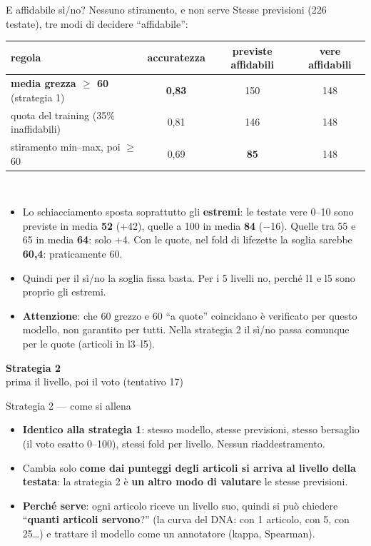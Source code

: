 \documentclass[aspectratio=169]{beamer}
\newcommand{\hl}[1]{\textbf{#1}}
\newcommand{\divider}[2]{%
  \begin{frame}[plain]
    \vfill
    \begin{center}
      {\color{dividerblue}\Huge\textbf{#1}}\\[0.8em]
      {\large #2}
    \end{center}
    \vfill
  \end{frame}}
\newcommand{\errore}[1]{\textcolor{rosso}{\textbf{#1}}}
\begin{document}
\begin{frame}{E affidabile s\`i/no? Nessuno stiramento, e non serve}
  \small
  Stesse previsioni (226 testate), tre modi di decidere ``affidabile'':\\[0.5em]
  \centering
  \begin{tabular}{lccc}
    \toprule
    \textbf{regola} & \textbf{accuratezza} & \textbf{previste affidabili} & \textbf{vere affidabili} \\
    \midrule
    \hl{media grezza $\ge$ 60} (strategia 1) & \textbf{0,83} & 150 & 148 \\
    quota del training (35\% inaffidabili) & 0,81 & 146 & 148 \\
    stiramento min--max, poi $\ge$ 60 & 0,69 & \errore{85} & 148 \\
    \bottomrule
  \end{tabular}\\[1em]
  \raggedright
  \begin{itemize}
    \setlength\itemsep{0.4em}
    \item Lo schiacciamento sposta soprattutto gli \hl{estremi}: le testate vere 0--10 sono previste in media \hl{52} (+42), quelle
          a 100 in media \hl{84} ($-$16). Quelle tra 55 e 65 in media \hl{64}: solo +4. Con le quote, nel fold di lifezette la
          soglia sarebbe \hl{60,4}: praticamente 60.
    \item Quindi per il s\`i/no la soglia fissa basta. Per i 5 livelli no, perch\'e l1 e l5 sono proprio gli estremi.
    \item \hl{Attenzione}: che 60 grezzo e 60 ``a quote'' coincidano \`e verificato per questo modello, non garantito per tutti.
          Nella strategia 2 il s\`i/no passa comunque per le quote (articoli in l3--l5).
  \end{itemize}
\end{frame}

\divider{Strategia 2}{prima il livello, poi il voto (tentativo 17)}

\begin{frame}{Strategia 2 --- come si allena}
  \vfill
  \begin{itemize}
    \setlength\itemsep{0.9em}
    \item \hl{Identico alla strategia 1}: stesso modello, stesse previsioni, stesso bersaglio (il voto esatto 0--100), stessi
          fold per livello. Nessun riaddestramento.
    \item Cambia solo \hl{come dai punteggi degli articoli si arriva al livello della testata}: la strategia 2 \`e
          \hl{un altro modo di valutare} le stesse previsioni.
    \item \hl{Perch\'e serve}: ogni articolo riceve un livello suo, quindi si pu\`o chiedere ``\hl{quanti articoli servono}?''
          (la curva del DNA: con 1 articolo, con 5, con 25\ldots) e trattare il modello come un annotatore (kappa, Spearman).
  \end{itemize}
  \vfill
\end{frame}
\end{document}
